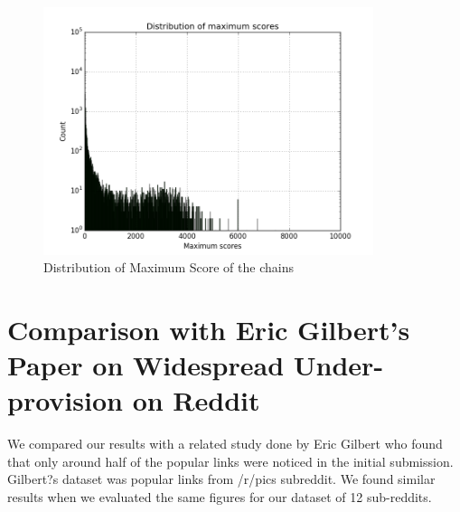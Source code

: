 \documentclass{article} %
\begin{document}
\begin{figure}[h]
\begin{center}
\includegraphics[width=3.8in]{max_score_distribution.png}
\caption{Distribution of Maximum Score of the chains}
\end{center}
\end{figure}

\newpage


\section{Comparison with Eric Gilbert's Paper on Widespread Under-provision on Reddit}

We compared our results with a related study done by Eric Gilbert who found that only around half of the popular links were noticed in the initial submission. Gilbert?s dataset was popular links from /r/pics subreddit. We found similar results when we evaluated the same figures for our dataset of 12 sub-reddits.
\end{document}

